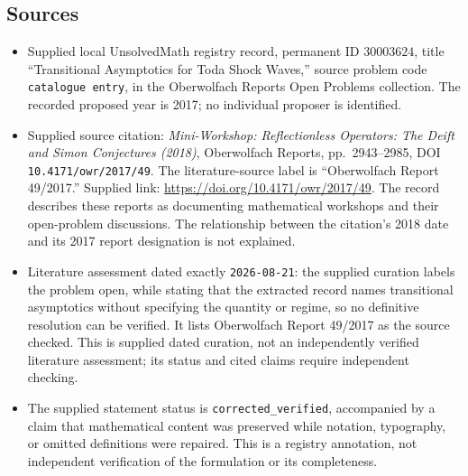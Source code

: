 \documentclass[11pt]{article}
\begin{document}
\subsection{Sources}
\begin{itemize}
\item Supplied local UnsolvedMath registry record, permanent ID \(30003624\), title ``Transitional Asymptotics for Toda Shock Waves,'' source problem code \texttt{catalogue entry}, in the Oberwolfach Reports Open Problems collection. The recorded proposed year is 2017; no individual proposer is identified.
\item Supplied source citation: \emph{Mini-Workshop: Reflectionless Operators: The Deift and Simon Conjectures (2018)}, Oberwolfach Reports, pp.\ 2943--2985, DOI \texttt{10.4171/owr/2017/49}. The literature-source label is ``Oberwolfach Report 49/2017.'' Supplied link: \url{https://doi.org/10.4171/owr/2017/49}. The record describes these reports as documenting mathematical workshops and their open-problem discussions. The relationship between the citation's 2018 date and its 2017 report designation is not explained.
\item Literature assessment dated exactly \texttt{2026-08-21}: the supplied curation labels the problem open, while stating that the extracted record names transitional asymptotics without specifying the quantity or regime, so no definitive resolution can be verified. It lists Oberwolfach Report 49/2017 as the source checked. This is supplied dated curation, not an independently verified literature assessment; its status and cited claims require independent checking.
\item The supplied statement status is \texttt{corrected\_verified}, accompanied by a claim that mathematical content was preserved while notation, typography, or omitted definitions were repaired. This is a registry annotation, not independent verification of the formulation or its completeness.
\end{itemize}
\end{document}
